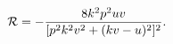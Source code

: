 \begin{equation}\label{cscalepmn1}
{\cal R} = -\frac{8k^2 p^2 u v}{[p^2k^2v^2+(kv-u)^2]^2}.
\end{equation}

